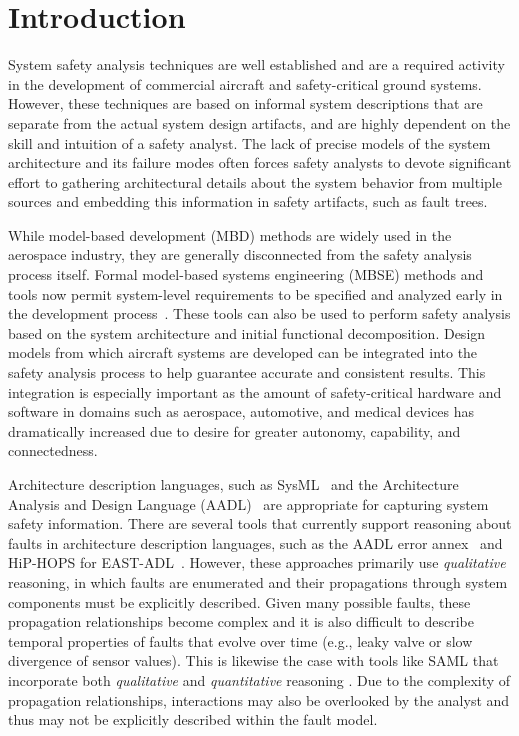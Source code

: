 \section{Introduction}

System safety analysis techniques are well established and are a required activity in the development of commercial aircraft and safety-critical ground systems. However, these techniques are based on informal system descriptions that are separate from the actual system design artifacts, and are highly dependent on the skill and intuition of a safety analyst. The lack of precise models of the system architecture and its failure modes often forces safety analysts to devote significant effort to gathering architectural details about the system behavior from multiple sources and embedding this information in safety artifacts, such as fault trees.

While model-based development (MBD) methods are widely used in the aerospace industry, they are generally disconnected from the safety analysis process itself. Formal model-based systems engineering (MBSE) methods and tools now permit system-level requirements to be specified and analyzed early in the development process~\cite{QFCS15:backes,hilt2013,NFM2012:CoGaMiWhLaLu,DBLP:journals/scp/CimattiT15,Pajic2012,DBLP:conf/adaEurope/SokolskyLC09}. These tools can also be used to perform safety analysis based on the system architecture and initial functional decomposition. Design models from which aircraft systems are developed can be integrated into the safety analysis process to help guarantee accurate and consistent results. This integration is especially important as the amount of safety-critical hardware and software in domains such as aerospace, automotive, and medical devices has dramatically increased due to desire for greater autonomy, capability, and connectedness.

Architecture description languages, such as SysML~\cite{SysML} and the Architecture Analysis and Design Language (AADL)~\cite{AADL} are appropriate for capturing system safety information.  There are several tools that currently support reasoning about faults in architecture description languages, such as the AADL error annex~\cite{Larson:2013:IAE:2527269.2527271} and HiP-HOPS for EAST-ADL~\cite{CHEN201391}.  However, these approaches primarily use {\em qualitative} reasoning, in which faults are enumerated and their propagations through system components must be explicitly described.  Given many possible faults, these propagation relationships become complex and it is also difficult to describe temporal properties of faults that evolve over time (e.g., leaky valve or slow divergence of sensor values). This is likewise the case with tools like SAML that incorporate both \textit{qualitative} and \textit{quantitative} reasoning \cite{Gudemann:2010:FQQ:1909626.1909813}. Due to the complexity of propagation relationships, interactions may also be overlooked by the analyst and thus may not be explicitly described within the fault model.

